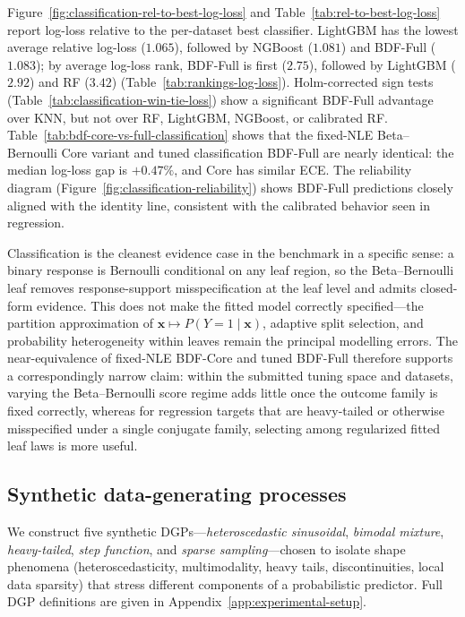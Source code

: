 Figure~\ref{fig:classification-rel-to-best-log-loss} and Table~\ref{tab:rel-to-best-log-loss} report log-loss relative to the per-dataset best classifier. LightGBM has the lowest average relative log-loss ($1.065$), followed by NGBoost ($1.081$) and BDF-Full ($1.083$); by average log-loss rank, BDF-Full is first ($2.75$), followed by LightGBM ($2.92$) and RF ($3.42$) (Table~\ref{tab:rankings-log-loss}). Holm-corrected \citep{holm1979simple} sign tests (Table~\ref{tab:classification-win-tie-loss}) show a significant BDF-Full advantage over KNN, but not over RF, LightGBM, NGBoost, or calibrated RF. Table~\ref{tab:bdf-core-vs-full-classification} shows that the fixed-NLE Beta--Bernoulli Core variant and tuned classification BDF-Full are nearly identical: the median log-loss gap is $+0.47\%$, and Core has similar ECE. The reliability diagram (Figure~\ref{fig:classification-reliability}) shows BDF-Full predictions closely aligned with the identity line, consistent with the calibrated behavior seen in regression.

Classification is the cleanest evidence case in the benchmark in a specific sense: a binary response is Bernoulli conditional on any leaf region, so the Beta--Bernoulli leaf removes response-support misspecification at the leaf level and admits closed-form evidence. This does not make the fitted model correctly specified---the partition approximation of $\mathbf{x}\mapsto P(Y{=}1\mid\mathbf{x})$, adaptive split selection, and probability heterogeneity within leaves remain the principal modelling errors. The near-equivalence of fixed-NLE BDF-Core and tuned BDF-Full therefore supports a correspondingly narrow claim: within the submitted tuning space and datasets, varying the Beta--Bernoulli score regime adds little once the outcome family is fixed correctly, whereas for regression targets that are heavy-tailed or otherwise misspecified under a single conjugate family, selecting among regularized fitted leaf laws is more useful.



\subsection{Synthetic data-generating processes}\label{subsec:exp_synthetic}

We construct five synthetic DGPs---\emph{heteroscedastic sinusoidal}, \emph{bimodal mixture}, \emph{heavy-tailed}, \emph{step function}, and \emph{sparse sampling}---chosen to isolate shape phenomena (heteroscedasticity, multimodality, heavy tails, discontinuities, local data sparsity) that stress different components of a probabilistic predictor. Full DGP definitions are given in Appendix~\ref{app:experimental-setup}.

